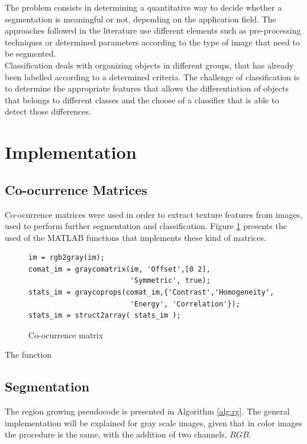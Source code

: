 \documentclass{IEEEtran}
\begin{document}
The problem consists in determining a quantitative way to decide whether a
segmentation is meaningful or not, depending on the application field. The
approaches followed in the literature use different elements such as
pre-processing techniques or determined parameters according to the 
type of image that need to be segmented. \cite{haralick1985image}\\

Classification deals with organizing objects in different groups, that has already been labelled according to a determined criteria. The challenge of classification is to determine the appropriate features that allows the differentiation of objects that belongs to different classes and the choose of a classifier that is able to detect those differences.

\section{Implementation}

\subsection{Co-ocurrence Matrices}

Co-ocurrence matrices were used in order to extract texture features from images, used to perform further segmentation and classification. Figure \ref{code:co_matrix} presents the used of the MATLAB functions that implements these kind of matrices. 

\begin{figure}[h!]
\begin{lstlisting}
im = rgb2gray(im);
comat_im = graycomatrix(im, 'Offset',[0 2], 
						'Symmetric', true);
stats_im = graycoprops(comat_im,{'Contrast','Homogeneity', 
						'Energy', 'Correlation'});
stats_im = struct2array( stats_im );
\end{lstlisting} 
 \caption{Co-ocurrence matrix}
 \label{code:co_matrix}
\end{figure}

The function 

\subsection{Segmentation}


The region growing pseudocode is presented in Algorithm \ref{alg:rg}. The general 
implementation will be explained for gray scale images, given that in
color images the procedure is the same, with the addition of two channels,
$RGB$.\\
\end{document}
